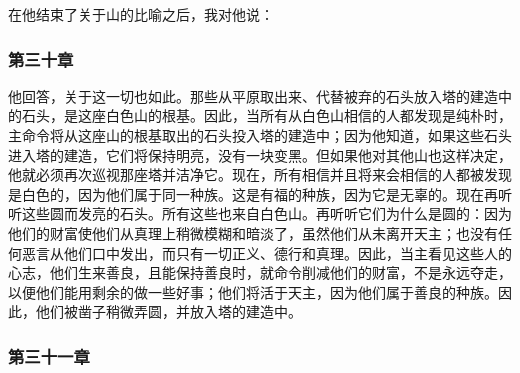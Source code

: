 \par

在他结束了关于山的比喻之后，我对他说：\par


\subsubsection{第三十章}

 他回答，关于这一切也如此。那些从平原取出来、代替被弃的石头放入塔的建造中的石头，是这座白色山的根基。因此，当所有从白色山相信的人都发现是纯朴时，主命令将从这座山的根基取出的石头投入塔的建造中；因为他知道，如果这些石头进入塔的建造，它们将保持明亮，没有一块变黑。但如果他对其他山也这样决定，他就必须再次巡视那座塔并洁净它。现在，所有相信并且将来会相信的人都被发现是白色的，因为他们属于同一种族。这是有福的种族，因为它是无辜的。现在再听听这些圆而发亮的石头。所有这些也来自白色山。再听听它们为什么是圆的：因为他们的财富使他们从真理上稍微模糊和暗淡了，虽然他们从未离开天主；也没有任何恶言从他们口中发出，而只有一切正义、德行和真理。因此，当主看见这些人的心志，他们生来善良，且能保持善良时，就命令削减他们的财富，不是永远夺走，以便他们能用剩余的做一些好事；他们将活于天主，因为他们属于善良的种族。因此，他们被凿子稍微弄圆，并放入塔的建造中。\par


\subsubsection{第三十一章}

